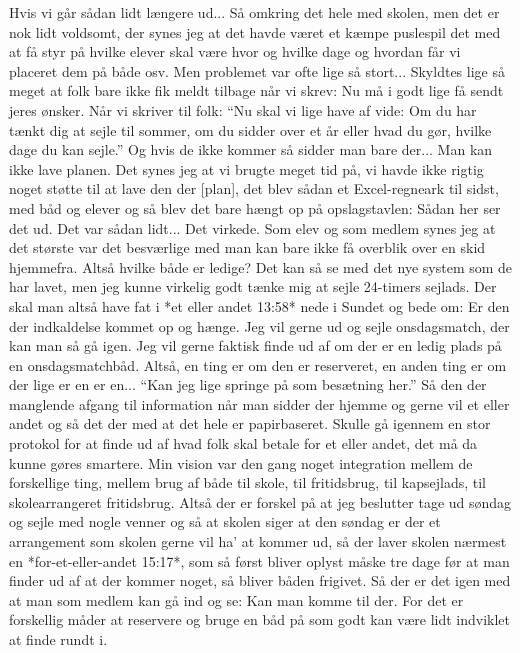 Hvis vi går sådan lidt længere ud... Så omkring det hele med skolen, men det er nok lidt voldsomt, der synes jeg at det havde været et kæmpe puslespil det med at få styr på hvilke elever skal være hvor og hvilke dage og hvordan får vi placeret dem på både osv. Men problemet var ofte lige så stort... Skyldtes lige så meget at folk bare ikke fik meldt tilbage når vi skrev: Nu må i godt lige få sendt jeres ønsker. Når vi skriver til folk: ``Nu skal vi lige have af vide: Om du har tænkt dig at sejle til sommer, om du sidder over et år eller hvad du gør, hvilke dage du kan sejle.'' Og hvis de ikke kommer så sidder man bare der... Man kan ikke lave planen. Det synes jeg at vi brugte meget tid på, vi havde ikke rigtig noget støtte til at lave den der [plan], det blev sådan et Excel-regneark til sidst, med båd og elever og så blev det bare hængt op på opslagstavlen: Sådan her ser det ud. Det var sådan lidt... Det virkede.
Som elev og som medlem synes jeg at det største var det besværlige med man kan bare ikke få overblik over en skid hjemmefra. Altså hvilke både er ledige? Det kan så se med det nye system som de har lavet, men jeg kunne virkelig godt tænke mig at sejle 24-timers sejlads. Der skal man altså have fat i *et eller andet 13:58* nede i Sundet og bede om: Er den der indkaldelse kommet op og hænge. Jeg vil gerne ud og sejle onsdagsmatch, der kan man så gå igen. Jeg vil gerne faktisk finde ud af om der er en ledig plads på en onsdagsmatchbåd. Altså, en ting er om den er reserveret, en anden ting er om der lige er en er en... ``Kan jeg lige springe på som besætning her.'' Så den der manglende afgang til information når man sidder der hjemme og gerne vil et eller andet og så det der med at det hele er papirbaseret. Skulle gå igennem en stor protokol for at finde ud af hvad folk skal betale for et eller andet, det må da kunne gøres smartere. Min vision var den gang noget integration mellem de forskellige ting, mellem brug af både til skole, til fritidsbrug, til kapsejlads, til skolearrangeret fritidsbrug. Altså der er forskel på at jeg beslutter tage ud søndag og sejle med nogle venner og så at skolen siger at den søndag er der et arrangement som skolen gerne vil ha' at kommer ud, så der laver skolen nærmest en *for-et-eller-andet 15:17*, som så først bliver oplyst måske tre dage før at man finder ud af at der kommer noget, så bliver båden frigivet. Så der er det igen med at man som medlem kan gå ind og se: Kan man komme til der. For det er forskellig måder at reservere og bruge en båd på som godt kan være lidt indviklet at finde rundt i. 

